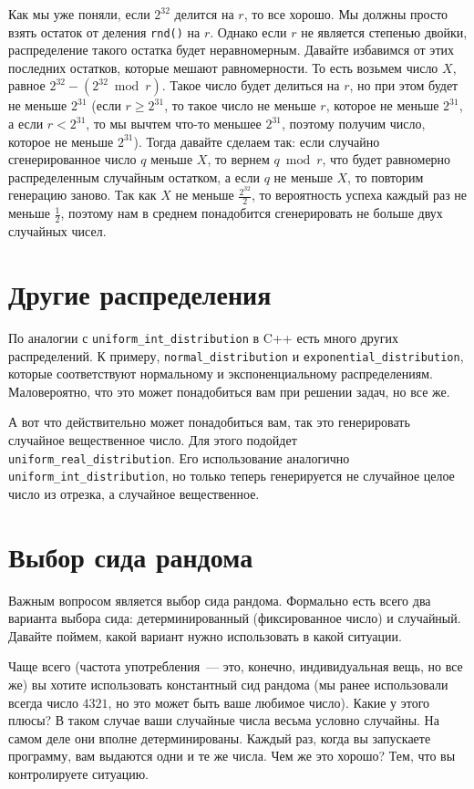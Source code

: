 Как мы уже поняли, если $2^{32}$ делится на $r$, то все хорошо. Мы должны просто взять остаток от деления \verb+rnd()+ на $r$. Однако если $r$ не является степенью двойки, распределение такого остатка будет неравномерным. Давайте избавимся от этих последних остатков, которые мешают равномерности. То есть возьмем число $X$, равное $2^{32} - (2^{32} \bmod r)$. Такое число будет делиться на $r$, но при этом будет не меньше $2^{31}$ (если $r \ge 2^{31}$, то такое число не меньше $r$, которое не меньше $2^{31}$, а если $r < 2^{31}$, то мы вычтем что-то меньшее $2^{31}$, поэтому получим число, которое не меньше $2^{31}$). Тогда давайте сделаем так: если случайно сгенерированное число $q$ меньше $X$, то вернем $q \bmod r$, что будет равномерно распределенным случайным остатком, а если $q$ не меньше $X$, то повторим генерацию заново. Так как $X$ не меньше $\frac{2^{32}}{2}$, то вероятность успеха каждый раз не меньше $\frac{1}{2}$, поэтому нам в среднем понадобится сгенерировать не больше двух случайных чисел.

\section{Другие распределения}

По аналогии с \verb+uniform_int_distribution+ в C++ есть много других распределений. К примеру, \verb+normal_distribution+ и \verb+exponential_distribution+, которые соответствуют нормальному и экспоненциальному распределениям. Маловероятно, что это может понадобиться вам при решении задач, но все же.

А вот что действительно может понадобиться вам, так это генерировать случайное вещественное число. Для этого подойдет \verb+uniform_real_distribution+. Его использование аналогично \verb+uniform_int_distribution+, но только теперь генерируется не случайное целое число из отрезка, а случайное вещественное.

\section{Выбор сида рандома}

Важным вопросом является выбор сида рандома. Формально есть всего два варианта выбора сида: детерминированный (фиксированное число) и случайный. Давайте поймем, какой вариант нужно использовать в какой ситуации.

Чаще всего (частота употребления~--- это, конечно, индивидуальная вещь, но все же) вы хотите использовать константный сид рандома (мы ранее использовали всегда число $4321$, но это может быть ваше любимое число). Какие у этого плюсы? В таком случае ваши случайные числа весьма условно случайны. На самом деле они вполне детерминированы. Каждый раз, когда вы запускаете программу, вам выдаются одни и те же числа. Чем же это хорошо? Тем, что вы контролируете ситуацию.

